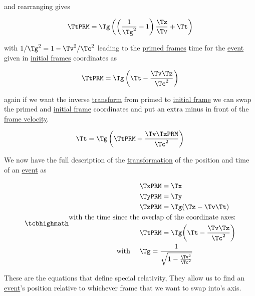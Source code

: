and rearranging gives

\begin{equation}
	\TtPRM  = \Tg  \left( \left( \dfrac{1}{\Tg ^2} -1 \right)\frac{\Tz }{\Tv } + \Tt  \right)
\end{equation}

with $1/{\Tg }^2 = 1-{\Tv }^2/{\Tc }^2$ leading to the \hyperlink{def-Primed-Frame}{primed frames} time for the \hyperlink{def-event}{event} given in \hyperlink{def-initial-Frame}{initial frames} coordinates as

\begin{equation}
	\TtPRM  = \Tg  \left( \Tt -\dfrac{\Tv  \Tz }{\Tc ^2} \right)
\end{equation}

again if we want the inverse \hyperlink{def-transform}{transform} from primed to \hyperlink{def-initial-Frame}{initial frame} we can swap the primed and \hyperlink{def-initial-Frame}{initial frame} coordinates and put an extra minus in front of the \hyperlink{def-frame-velocity}{frame velocity}.

\begin{equation}
	{\Tt } = \Tg  \left( \TtPRM +\dfrac{\Tv  \TzPRM }{\Tc ^2} \right)
\end{equation}

We now have the full description of the \hyperlink{def-transform}{transformation} of the position and time of an \hyperlink{def-event}{event} as

\begin{equation}
	\mhl{
		\begin{aligned}
			 & {\TxPRM  } = \Tx                                            \\
			 & {\TyPRM  } = \Ty                                            \\
			 & {\TzPRM  } = \Tg  ({\Tz }-{\Tv }{\Tt })                       \\
			\text{with the time since the}&\text{ overlap of the coordinate axes:} \\
			& \TtPRM  = \Tg  \bigg(\Tt -\frac{ {\Tv }{\Tz } }{ \Tc ^2}\bigg) \\
			\text{with }\quad&  \Tg  = \dfrac{1}{\sqrt{1-\frac{ {\Tv }^2}{ \Tc ^2} } }
		\end{aligned}
	}
	\label{eq: Lorentz transformation}
\end{equation}

These are the equations that define special relativity, They allow us to find an \hyperlink{def-event}{event}'s position relative to whichever frame that we want to swap into's axis.

